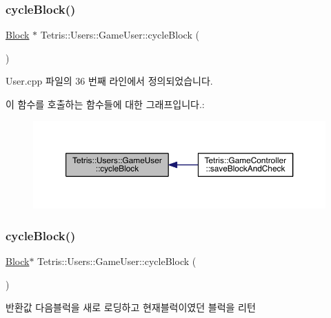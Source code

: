 \subsubsection{\texorpdfstring{cycle\+Block()}{cycleBlock()}\hspace{0.1cm}{\footnotesize\ttfamily [1/2]}}
{\footnotesize\ttfamily \hyperlink{class_tetris_1_1_block}{Block} $\ast$ Tetris\+::\+Users\+::\+Game\+User\+::cycle\+Block (\begin{DoxyParamCaption}{ }\end{DoxyParamCaption})}



User.\+cpp 파일의 36 번째 라인에서 정의되었습니다.

이 함수를 호출하는 함수들에 대한 그래프입니다.\+:
\nopagebreak
\begin{figure}[H]
\begin{center}
\leavevmode
\includegraphics[width=350pt]{class_tetris_1_1_users_1_1_game_user_a5efbd1ed9fa84a4041c218fb32463c36_icgraph}
\end{center}
\end{figure}
\mbox{\label{class_tetris_1_1_users_1_1_game_user_a6011fe9738235fa93fac51db4fafdbd7}} 
\subsubsection{\texorpdfstring{cycle\+Block()}{cycleBlock()}\hspace{0.1cm}{\footnotesize\ttfamily [2/2]}}
{\footnotesize\ttfamily \hyperlink{class_tetris_1_1_block}{Block}$\ast$ Tetris\+::\+Users\+::\+Game\+User\+::cycle\+Block (\begin{DoxyParamCaption}{ }\end{DoxyParamCaption})\hspace{0.3cm}{\ttfamily [inline]}}

\begin{DoxyReturn}{반환값}
다음블럭을 새로 로딩하고 현재블럭이였던 블럭을 리턴 
\end{DoxyReturn}



